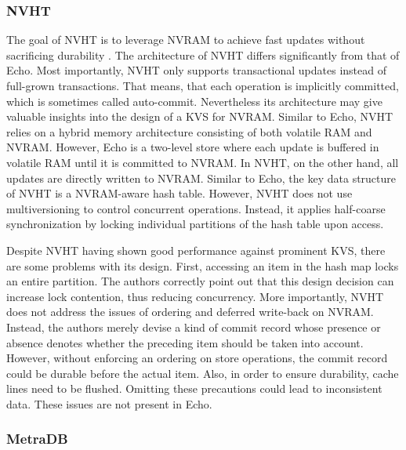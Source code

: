 \subsubsection{NVHT}

The goal of NVHT is to leverage NVRAM to achieve fast updates without
sacrificing durability \cite{zhou2016nvht}. The architecture of NVHT differs
significantly from that of Echo. Most importantly, NVHT only supports
transactional updates instead of full-grown transactions. That means, that each
operation is implicitly committed, which is sometimes called auto-commit.
Nevertheless its architecture may give valuable insights into the design of a
KVS for NVRAM. Similar to Echo, NVHT relies on a hybrid memory architecture
consisting of both volatile RAM and NVRAM. However, Echo is a two-level store
where each update is buffered in volatile RAM until it is committed to NVRAM. In
NVHT, on the other hand, all updates are directly written to NVRAM. Similar to
Echo, the key data structure of NVHT is a NVRAM-aware hash table. However, NVHT
does not use multiversioning to control concurrent operations. Instead, it
applies half-coarse synchronization by locking individual partitions of the hash
table upon access.

Despite NVHT having shown good performance against prominent KVS, there are some
problems with its design. First, accessing an item in the hash map locks an
entire partition. The authors correctly point out that this design decision can
increase lock contention, thus reducing concurrency. More importantly, NVHT does
not address the issues of ordering and deferred write-back on NVRAM. Instead,
the authors merely devise a kind of commit record whose presence or absence
denotes whether the preceding item should be taken into account. However,
without enforcing an ordering on store operations, the commit record could be
durable before the actual item. Also, in order to ensure durability, cache lines
need to be flushed. Omitting these precautions could lead to inconsistent data.
These issues are not present in Echo.

\subsubsection{MetraDB}

